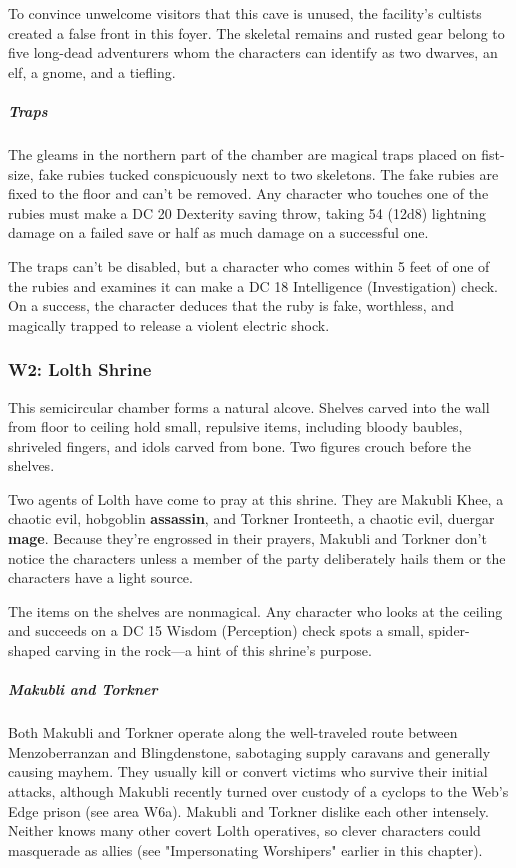 \documentclass[10pt,a4paper,twoside,bg=print,twocolumn,openany,nodeprecatedcode]{dndbook}
\begin{document}
To convince unwelcome visitors that this cave is unused, the facility's cultists created a false front in this foyer. The skeletal remains and rusted gear belong to five long-dead adventurers whom the characters can identify as two dwarves, an elf, a gnome, and a tiefling.

\subparagraph{Traps}
The gleams in the northern part of the chamber are magical traps placed on fist-size, fake rubies tucked conspicuously next to two skeletons. The fake rubies are fixed to the floor and can't be removed. Any character who touches one of the rubies must make a DC 20 Dexterity saving throw, taking 54 (12d8) lightning damage on a failed save or half as much damage on a successful one.

The traps can't be disabled, but a character who comes within 5 feet of one of the rubies and examines it can make a DC 18 Intelligence (Investigation) check. On a success, the character deduces that the ruby is fake, worthless, and magically trapped to release a violent electric shock.

\subsubsection{W2: Lolth Shrine}
\begin{DndReadAloud}{}
This semicircular chamber forms a natural alcove. Shelves carved into the wall from floor to ceiling hold small, repulsive items, including bloody baubles, shriveled fingers, and idols carved from bone. Two figures crouch before the shelves.

\end{DndReadAloud}

Two agents of Lolth have come to pray at this shrine. They are Makubli Khee, a chaotic evil, hobgoblin \textbf{assassin}, and Torkner Ironteeth, a chaotic evil, duergar \textbf{mage}. Because they're engrossed in their prayers, Makubli and Torkner don't notice the characters unless a member of the party deliberately hails them or the characters have a light source.

The items on the shelves are nonmagical. Any character who looks at the ceiling and succeeds on a DC 15 Wisdom (Perception) check spots a small, spider-shaped carving in the rock—a hint of this shrine's purpose.

\subparagraph{Makubli and Torkner}
Both Makubli and Torkner operate along the well-traveled route between Menzoberranzan and Blingdenstone, sabotaging supply caravans and generally causing mayhem. They usually kill or convert victims who survive their initial attacks, although Makubli recently turned over custody of a cyclops to the Web's Edge prison (see area W6a). Makubli and Torkner dislike each other intensely. Neither knows many other covert Lolth operatives, so clever characters could masquerade as allies (see "Impersonating Worshipers" earlier in this chapter).
\end{document}
